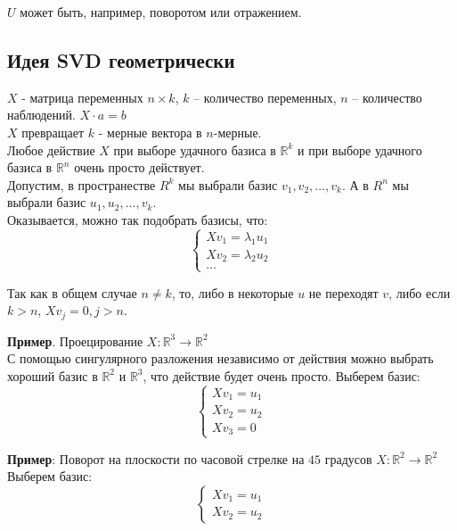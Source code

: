 \documentclass[12pt]{article} %
\theoremstyle{definition} %
\begin{document}
$U$ может быть, например, поворотом или отражением.

\subsection{Идея SVD геометрически}
$X$ - матрица переменных $n \times k$, $k$ -- количество переменных, $n$ -- количество наблюдений.
$X \cdot a = b$\\
$X$ превращает $k$ - мерные вектора в $n$-мерные.\\
Любое действие $X$ при выборе удачного базиса в $\mathbb{R}^k$ и при выборе удачного базиса в $\mathbb{R}^n$ очень просто действует. \\
Допустим, в пространестве $R^k$ мы выбрали базис $v_1, v_2, \ldots, v_k$. А в $R^n$ мы выбрали базис $u_1, u_2, \ldots, v_k$.\\
Оказывается, можно так подобрать базисы, что:
\begin{equation*}
 \begin{cases}
   Xv_1=\lambda_1u_1
   \\
 Xv_2=\lambda_2u_2
 \\
 \ldots
 \end{cases}
\end{equation*}

Так как в общем случае $n \neq k$, то, либо в некоторые $u$ не переходят $v$, либо
если $k>n$, $Xv_j=0, j>n$.

\textbf{Пример}. Проецирование $X:\mathbb{R} ^3 \rightarrow  \mathbb{R} ^2$\\
С помощью сингулярного разложения независимо от действия можно выбрать хороший базис в $\mathbb{R} ^2$ и $\mathbb{R} ^3$, что действие будет очень просто. Выберем базис:
\begin{equation*}
 \begin{cases}
   Xv_1=u_1
   \\
 Xv_2=u_2
 \\
 Xv_3=0
 \end{cases}
\end{equation*}

\textbf{Пример}: Поворот на плоскости по часовой стрелке на $45$ градусов $X:\mathbb{R} ^2 \rightarrow  \mathbb{R} ^2$\\
Выберем базис:
\begin{equation*}
 \begin{cases}
   Xv_1=u_1
   \\
Xv_2=u_2
 \end{cases}
\end{equation*} 
\end{document}
